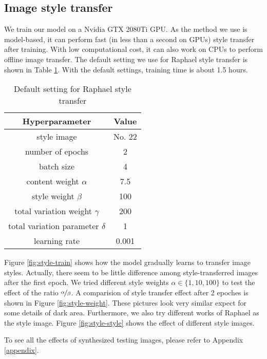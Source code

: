 \documentclass{article}
\begin{document}
\subsection{Image style transfer}
\label{style-experiments}

We train our model on a Nvidia GTX 2080Ti GPU. As the method we use is model-based, it can perform fast (in less than a second on GPUs) style transfer after training. With low computational cost, it can also work on CPUs to perform offline image transfer. The default setting we use for Raphael style transfer is shown in Table \ref{tab:default-setting}. With the default settings, training time is about 1.5 hours.

\begin{table}[htb]
  \caption{Default setting for Raphael style transfer}
  \label{tab:default-setting}
  \centering
  \begin{tabular}{cc}
\hline
Hyperparameter & Value   \\ \hline
style image           & No. 22  \\
number of epochs           & 2  \\
batch size            & 4   \\
content weight $\alpha$          & 7.5  \\
style weight $\beta$           & 100  \\
total variation weight $\gamma$           & 200 \\
total variation parameter $\delta$           & 1  \\
learning rate           & 0.001  \\ \hline
\end{tabular}
\end{table}

Figure \ref{fig:style-train} shows how the model gradually learns to transfer image styles. Actually, there seem to be little difference among style-transferred images after the first epoch. 
We tried different style weights $\alpha\in\{1, 10, 100\}$ to test the effect of the ratio $\nicefrac{\alpha}{\beta}$. A comparision of style transfer effect after 2 epoches is shown in Figure \ref{fig:style-weight}. These pictures look very similar expect for some details of dark area.
Furthermore, we also try different works of Raphael as the style image. Figure \ref{fig:style-style} shows the effect of different style images.

To see all the effects of synthesized testing images, please refer to Appendix \ref{appendix}.
\end{document}
